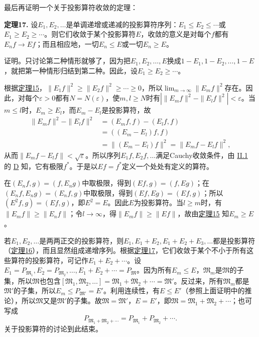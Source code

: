 \documentclass[fontsize=13pt,twoside,openany,headings=normal,parskip=false,bookmarkpackage=false,DIV=calc]{scrbook}
\newcommand{\textkaishu}[1]{{\zhkaishu #1}}
\begin{document}
最后再证明一个关于投影算符收敛的定理：

\leavevmode{}\textbf{定理17.}\label{thm:II.17} 设$E_1,\allowbreak E_2,\allowbreak \ldots$是单调递增或递减的投影算符序列：$E_1\leq E_2\leq\cdots$或$E_1\geq E_2\geq\cdots$。则它们收敛于某个投影算符$E$，收敛的意义是对每个$f$都有$E_nf\to Ef$；而且相应地，一切$E_n\leq E$或一切$E_n\geq E$。

\textkaishu{证明。}只讨论第二种情形就够了，因为把$E_1,\allowbreak E_2,\allowbreak \ldots,\allowbreak E$换成$1-E_1,\allowbreak 1-E_2,\allowbreak \ldots,\allowbreak 1-E$，就把第一种情形归结到第二种。因此，设$E_1\geq E_2\geq\cdots$。

根据\CJKglue \hyperref[thm:II.15]{定理15}，$\|E_1f\|^2\geq\|E_2f\|^2\geq\cdots\geq0$，所以$\lim_{m\to\infty}\|E_mf\|^2$存在。因此，对每个$\varepsilon>0$都有$N=N(\varepsilon)$，使$m,\allowbreak l\geq N$时有$|\|E_mf\|^2-\|E_lf\|^2|<\varepsilon$。当$m\leq l$时，$E_m\geq E_l$，而$E_m-E_l$是投影算符，故
\begin{align*}
\|E_mf\|^2-\|E_lf\|^2&=(E_mf,f)-(E_lf,f)\\
&=((E_m-E_l)f,f)\\
&=\|(E_m-E_l)f\|^2=\|E_mf-E_lf\|^2,
\end{align*}
从而$\|E_mf-E_lf\|<\sqrt\varepsilon$。所以序列$E_1f,\allowbreak E_2f,\allowbreak \ldots$满足Cauchy收敛条件，由 \hyperref[sec:II.1]{II.1} 的 \hyperref[ax:II.D]{D} 知，它有极限$f^*$。于是以$Ef=f^*$定义一个处处有定义的算符。

\hypertarget{origpage-46}{}\label{origpage-46}在$(E_nf,\allowbreak g)=(f,\allowbreak E_ng)$中取极限，得到$(Ef,\allowbreak g)=(f,\allowbreak Eg)$；在$(E_nf,\allowbreak E_ng)=(E_nf,\allowbreak g)$中取极限，得到$(Ef,\allowbreak Eg)=(Ef,\allowbreak g)$；所以$(E^2f,\allowbreak g)=(Ef,\allowbreak g)$，即$E^2=E$。因此$E$为投影算符。当$l\geq m$时，有$\|E_mf\|\geq\|E_nf\|$；令$l\to\infty$，得$\|E_mf\|\geq\|Ef\|$，故由\CJKglue \hyperref[thm:II.15]{定理15} 知$E_m\geq E$。

若$E_1,\allowbreak E_2,\allowbreak \ldots$是两两正交的投影算符，则$E_1,\allowbreak E_1+E_2,\allowbreak E_1+E_2+E_3,\allowbreak \ldots$都是投影算符（\hyperref[thm:II.16]{定理16}），而且显然组成递增序列。根据\CJKglue \hyperref[thm:II.17]{定理17}，它们收敛于某个不小于所有这些算符的投影算符，可记作$E_1+E_2+\cdots$。设$E_1=P_{\mathfrak{M}_1},\allowbreak E_2=P_{\mathfrak{M}_2},\allowbreak \ldots,\allowbreak E_1+E_2+\cdots=P_{\mathfrak{M}}$。因为所有$E_m\leq E$，$\mathfrak{M}_m$是$\mathfrak{M}$的子集，所以$\mathfrak{M}$也包含$[\mathfrak{M}_1,\allowbreak \mathfrak{M}_2,\allowbreak \ldots]=\mathfrak{M}_1+\mathfrak{M}_2+\cdots=\mathfrak{M}'$。反过来，所有$\mathfrak{M}_m$都是$\mathfrak{M}'$的子集，所以$E_m\leq P_{\mathfrak{M}'}=E'$。利用连续性，有$E\leq E'$（参照上面证明中的推论），所以$\mathfrak{M}$又是$\mathfrak{M}'$的子集。故$\mathfrak{M}=\mathfrak{M}'$，$E=E'$，即$\mathfrak{M}=\mathfrak{M}_1+\mathfrak{M}_2+\cdots$；也可写成
\[
P_{\mathfrak{M}_1+\mathfrak{M}_2+\cdots}=P_{\mathfrak{M}_1}+P_{\mathfrak{M}_2}+\cdots.
\]
关于投影算符的讨论到此结束。
\end{document}
